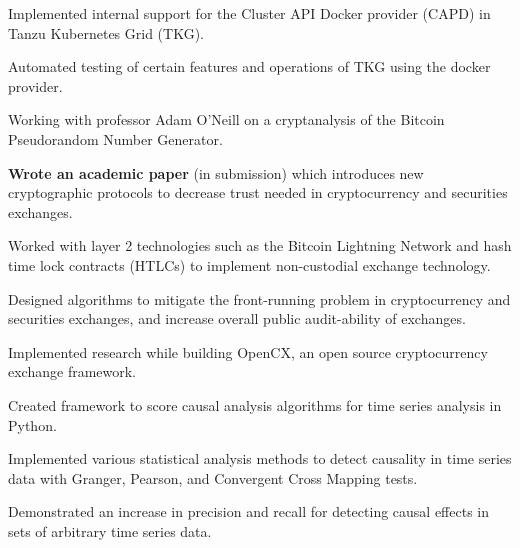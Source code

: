 
\begin{tightemize}
    \item Implemented internal support for the Cluster API Docker provider
        (CAPD) in Tanzu Kubernetes Grid (TKG).
    \item Automated testing of certain features and operations of TKG using the
        docker provider.
\end{tightemize}
\subsectionsep

\begin{tightemize}
    \item Working with professor Adam O'Neill on a cryptanalysis of the Bitcoin
        Pseudorandom Number Generator.
\end{tightemize}
\subsectionsep

\begin{tightemize}
  \item \textbf{Wrote an academic paper} (in submission) which
      introduces new cryptographic protocols to decrease trust needed
      in cryptocurrency and securities exchanges.
  \item Worked with layer 2 technologies such as the Bitcoin Lightning
      Network and hash time lock contracts (HTLCs) to implement
      non-custodial exchange technology.
  \item Designed algorithms to mitigate the front-running problem in
      cryptocurrency and securities exchanges, and increase overall
      public audit-ability of exchanges.
  \item Implemented research while building OpenCX, an open source
      cryptocurrency exchange framework.
\end{tightemize}
\subsectionsep

\begin{tightemize}
\item Created framework to score causal analysis algorithms for time
    series analysis in Python.
\item Implemented various statistical analysis methods to detect
    causality in time series data with Granger, Pearson, and
    Convergent Cross Mapping tests.
\item Demonstrated an increase in precision and recall for detecting
    causal effects in sets of arbitrary time series data.
\end{tightemize}
\subsectionsep

